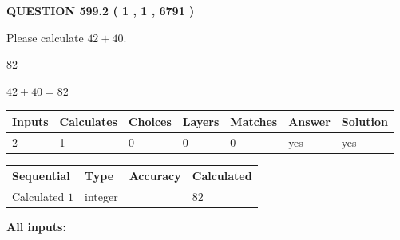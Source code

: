\documentclass[12pt]{article}
\begin{document}
   
  
\vspace{0.2in}
  
{\textbf{\Large{QUESTION
599.2 
 ( 1 , 1 , 6791 )
}}}
  
  
 
Please calculate $ %
42 +  %
40 $.
 
 
 
\noindent{}
 
 

82
 
 
\noindent{}
 
 

 
 
 
\noindent{}
 
 

$ %
42 +  %
40=   %
82$
 
 
\noindent{}
 
 

 
   
   
   
   
\noindent\begin{tabular}{|l|l|l|l|l|l|l|}
 \hline
Inputs & Calculates & Choices & Layers & Matches & Answer & Solution \\ \hline
 2  & 
 1  & 
 0
  & 
 0  & 
 0  & 
  yes & 
  yes 
  \\ \hline
 \end{tabular}
   
   
   
   
\noindent{}
   
   
  
  
\noindent\begin{tabular}{|l|l|l|l|}
\hline
 Sequential & Type & Accuracy & Calculated \\ 
\hline
 
 
  Calculated $  1 $ & integer &  & 
  $ 82 $ 
 \\  \hline  
 \end{tabular}
   
   
   
   
\noindent\vspace{0.1in}\hspace{-0.08in} {\textbf{\Large{All inputs: }}}
   
\end{document}

